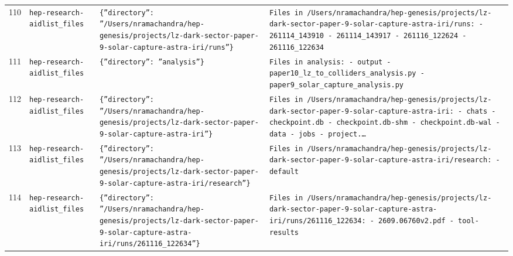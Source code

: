 \documentclass[11pt,a4paper]{article}
\begin{document}
\begin{longtable}{@{}p{}p{}p{}p{}@{}}
110 & \texttt{hep-research-aid}\newline\texttt{list\_\allowbreak{}files} & \texttt{\{''directory'':\allowbreak{} ''/\allowbreak{}Users/\allowbreak{}nramachandra/\allowbreak{}hep-genesis/\allowbreak{}projects/\allowbreak{}lz-dark-sector-paper-9-solar-capture-astra-iri/\allowbreak{}runs''\}\allowbreak{}} & \texttt{Files in /\allowbreak{}Users/\allowbreak{}nramachandra/\allowbreak{}hep-genesis/\allowbreak{}projects/\allowbreak{}lz-dark-sector-paper-9-solar-capture-astra-iri/\allowbreak{}runs:\allowbreak{}   - 261114\_\allowbreak{}143910   - 261114\_\allowbreak{}143917   - 261116\_\allowbreak{}122624   - 261116\_\allowbreak{}122634} \\
111 & \texttt{hep-research-aid}\newline\texttt{list\_\allowbreak{}files} & \texttt{\{''directory'':\allowbreak{} ''analysis''\}\allowbreak{}} & \texttt{Files in analysis:\allowbreak{}   - output   - paper10\_\allowbreak{}lz\_\allowbreak{}to\_\allowbreak{}colliders\_\allowbreak{}analysis.py   - paper9\_\allowbreak{}solar\_\allowbreak{}capture\_\allowbreak{}analysis.py} \\
112 & \texttt{hep-research-aid}\newline\texttt{list\_\allowbreak{}files} & \texttt{\{''directory'':\allowbreak{} ''/\allowbreak{}Users/\allowbreak{}nramachandra/\allowbreak{}hep-genesis/\allowbreak{}projects/\allowbreak{}lz-dark-sector-paper-9-solar-capture-astra-iri''\}\allowbreak{}} & \texttt{Files in /\allowbreak{}Users/\allowbreak{}nramachandra/\allowbreak{}hep-genesis/\allowbreak{}projects/\allowbreak{}lz-dark-sector-paper-9-solar-capture-astra-iri:\allowbreak{}   - chats   - checkpoint.db   - checkpoint.db-shm   - checkpoint.db-wal   - data   - jobs   - project.\ldots{}\allowbreak{}} \\
113 & \texttt{hep-research-aid}\newline\texttt{list\_\allowbreak{}files} & \texttt{\{''directory'':\allowbreak{} ''/\allowbreak{}Users/\allowbreak{}nramachandra/\allowbreak{}hep-genesis/\allowbreak{}projects/\allowbreak{}lz-dark-sector-paper-9-solar-capture-astra-iri/\allowbreak{}research''\}\allowbreak{}} & \texttt{Files in /\allowbreak{}Users/\allowbreak{}nramachandra/\allowbreak{}hep-genesis/\allowbreak{}projects/\allowbreak{}lz-dark-sector-paper-9-solar-capture-astra-iri/\allowbreak{}research:\allowbreak{}   - default} \\
114 & \texttt{hep-research-aid}\newline\texttt{list\_\allowbreak{}files} & \texttt{\{''directory'':\allowbreak{} ''/\allowbreak{}Users/\allowbreak{}nramachandra/\allowbreak{}hep-genesis/\allowbreak{}projects/\allowbreak{}lz-dark-sector-paper-9-solar-capture-astra-iri/\allowbreak{}runs/\allowbreak{}261116\_\allowbreak{}122634''\}\allowbreak{}} & \texttt{Files in /\allowbreak{}Users/\allowbreak{}nramachandra/\allowbreak{}hep-genesis/\allowbreak{}projects/\allowbreak{}lz-dark-sector-paper-9-solar-capture-astra-iri/\allowbreak{}runs/\allowbreak{}261116\_\allowbreak{}122634:\allowbreak{}   - 2609.06760v2.pdf   - tool-results} \\

\end{longtable}
\end{document}
